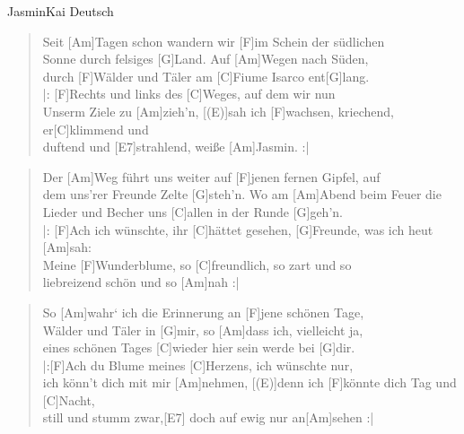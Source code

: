 \begin{song}{Jasmin}{Kai Deutsch}

    \begin{verse}  
        Seit [Am]Tagen schon wandern wir [F]im Schein der südlichen \\
        [C]Sonne durch felsiges [G]Land. \hspace{0,5em} Auf [Am]Wegen nach Süden, \\
        durch [F]Wälder und Täler am [C]Fiume Isarco ent[G]lang.\\
        |: [F]Rechts und links des [C]Weges, auf dem wir nun \\
        [G]Unserm Ziele zu [Am]zieh’n, \hspace{0,5em}[(E)]sah ich [F]wachsen, kriechend, er[C]klimmend und \\
        duftend und [E7]strahlend, weiße [Am]Jasmin. :|
    \end{verse}  

    \begin{verse}  
        Der [Am]Weg führt uns weiter auf [F]jenen fernen Gipfel, auf\\
        [C]dem uns’rer Freunde Zelte [G]steh’n. \hspace{0,5em} Wo am [Am]Abend beim Feuer die \\
        [F]Lieder und Becher uns [C]allen in der Runde [G]geh’n.\\
        |: [F]Ach ich wünschte, ihr [C]hättet gesehen, [G]Freunde, was ich heut [Am]sah: \\
        [(E)]Meine [F]Wunderblume, so [C]freundlich, so zart und so \\
        [E7]liebreizend schön und so [Am]nah :|
    \end{verse}  

    \begin{verse}  
        So [Am]wahr‘ ich die Erinnerung an [F]jene schönen Tage,\\ 
        [C]Wälder und Täler in [G]mir, \hspace{0.5em} so [Am]dass ich, vielleicht ja, \\
        [F]eines schönen Tages [C]wieder hier sein werde bei [G]dir.\\
        |:[F]Ach du Blume meines [C]Herzens, ich wünschte nur, \\
        [G]ich könn’t dich mit mir [Am]nehmen, \hspace{0,5em} [(E)]denn ich [F]könnte dich Tag und [C]Nacht, \\
        still und stumm zwar,[E7] doch auf ewig nur an[Am]sehen :|    
    \end{verse}  

\end{song}
